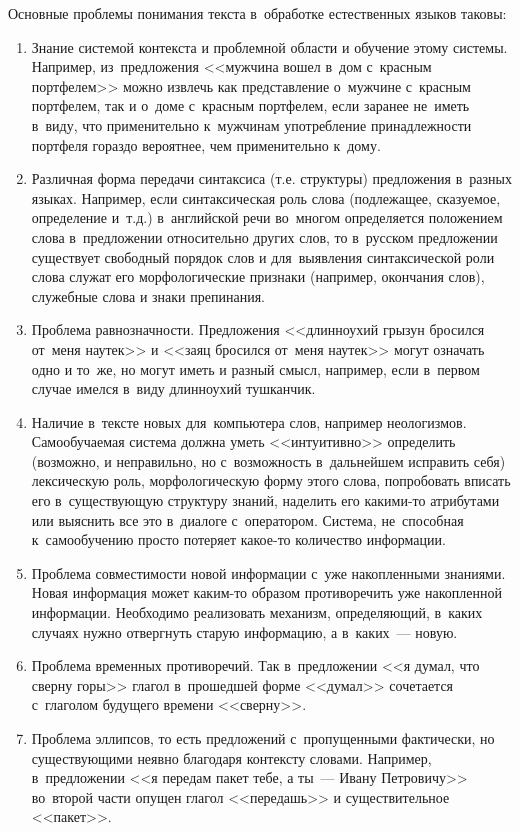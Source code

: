 \documentclass[12pt]{article}
\theoremstyle{definition}
\theoremstyle{remark}
\numberwithin{equation}{section}
\begin{document}
Основные проблемы понимания текста в~обработке естественных языков таковы:
\begin{enumerate}
    \item Знание системой контекста и проблемной области и обучение 
    этому системы. Например, из~предложения <<мужчина вошел в~дом 
    с~красным портфелем>> можно извлечь как представление о~мужчине 
    с~красным портфелем, так и о~доме с~красным портфелем, если 
    заранее не~иметь в~виду, что применительно к~мужчинам употребление 
    принадлежности портфеля гораздо вероятнее, чем применительно к~дому.
    \item Различная форма передачи синтаксиса (т.е. структуры) предложения 
    в~разных языках. Например, если синтаксическая роль слова (подлежащее, 
    сказуемое, определение и~т.д.) в~английской речи во~многом определяется 
    положением слова в~предложении относительно других слов, то в~русском 
    предложении существует свободный порядок слов и для~выявления 
    синтаксической роли слова служат его морфологические признаки 
    (например, окончания слов), служебные слова и знаки препинания.
    \item Проблема равнозначности. Предложения <<длинноухий грызун 
    бросился от~меня наутек>> и <<заяц бросился от~меня наутек>> 
    могут означать одно и то~же, но могут иметь и разный смысл, 
    например, если в~первом случае имелся в~виду длинноухий 
    тушканчик.
    \item Наличие в~тексте новых для~компьютера слов, например неологизмов. 
    Самообучаемая система должна уметь <<интуитивно>> определить 
    (возможно, и неправильно, но с~возможность в~дальнейшем исправить себя) 
    лексическую роль, морфологическую форму этого слова, попробовать вписать 
    его в~существующую структуру знаний, наделить его какими-то атрибутами 
    или выяснить все это в~диалоге с~оператором. Система, не~способная 
    к~самообучению просто потеряет какое-то количество информации.
    \item Проблема совместимости новой информации с~уже накопленными 
    знаниями. Новая информация может каким-то образом противоречить 
    уже накопленной информации. Необходимо реализовать механизм, определяющий, 
    в~каких случаях нужно отвергнуть старую информацию, а в~каких~--- новую.
    \item Проблема временных противоречий. Так в~предложении <<я думал, 
    что сверну горы>> глагол в~прошедшей форме <<думал>> сочетается 
    с~глаголом будущего времени <<сверну>>.
    \item Проблема эллипсов, то есть предложений с~пропущенными фактически, 
    но существующими неявно благодаря контексту словами. Например, 
    в~предложении <<я передам пакет тебе, а ты~--- Ивану Петровичу>> 
    во~второй части опущен глагол <<передашь>> и существительное <<пакет>>.
\end{enumerate}
\end{document}
